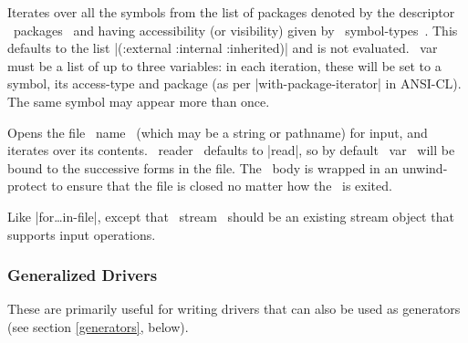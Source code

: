 \begin{clauses}
Iterates over all the symbols from the list of packages denoted by the
descriptor ~packages~ and having accessibility (or visibility) given by
~symbol-types~.  This defaults to the list |(:external :internal :inherited)|
and is not evaluated.  ~var~ must be a list of up to three variables: in each
iteration, these will be set to a symbol, its access-type and package (as per
|with-package-iterator| in ANSI-CL).  The same symbol may appear more than
once.

\end{clauses}

\begin{clauses}

Opens the file ~name~ (which may be a string or pathname) for input,
and iterates 
over its contents. ~reader~ defaults to |read|, so by default ~var~
will be bound to the successive forms in the file.  The \iter\ body is
wrapped in an unwind-protect to ensure that the file is closed no
matter how the \iter\ is exited.

Like |for\dots in-file|, except that ~stream~ should be an existing
stream object that supports input operations.

\end{clauses}

\subsubsection{Generalized Drivers}

These are primarily useful for writing drivers that can also be used
as generators (see section \ref{generators}, below).
 
